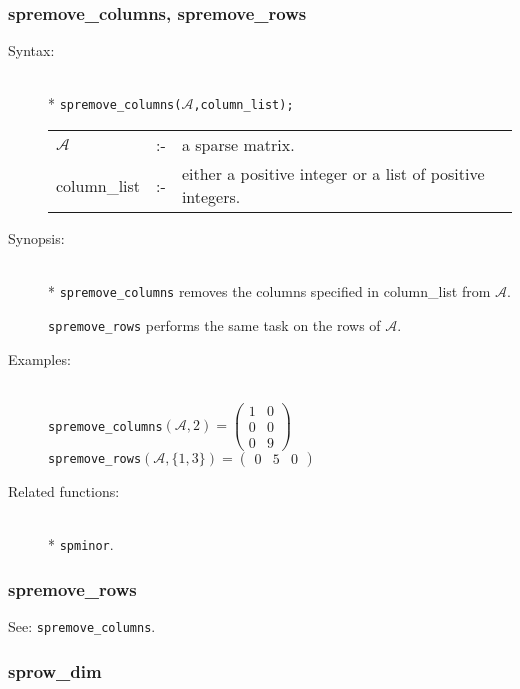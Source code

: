 \subsubsection{spremove\_columns, spremove\_rows}
\label{sparse:spremove_columns}

\begin{description}
\item[Syntax:]\mbox{}\\*
\texttt{spremove\_columns($\mathcal{A}$,column\_list);}\\[2mm]
\begin{tabular}{l l l}
$\mathcal{A}$   &:-& a sparse matrix. \\
column\_list &:-& either a positive integer or a list of
                  positive integers.
\end{tabular}

\item[Synopsis:]\mbox{}\\*
\texttt{spremove\_columns} removes the columns specified in
                column\_list from $\mathcal{A}$.

\texttt{spremove\_rows} performs the same task on the rows
                of $\mathcal{A}$.

\item[Examples:]\mbox{}\\
\texttt{spremove\_columns}\((\mathcal{A},2) =
        \begin{pmatrix} 1 & 0 \\ 0 & 0 \\ 0 & 9  \end{pmatrix}\) \\[2mm]
\texttt{spremove\_rows}\((\mathcal{A},\{1,3\}) =
        \begin{pmatrix} 0 & 5 & 0 \end{pmatrix}\)


\item[Related functions:]\mbox{}\\*
\texttt{spminor}.
\end{description}

\subsubsection{spremove\_rows}
\label{sparse:spremove_rows}

See: \texttt{spremove\_columns}.


\subsubsection{sprow\_dim}
\label{sparse:sprow_dim}

